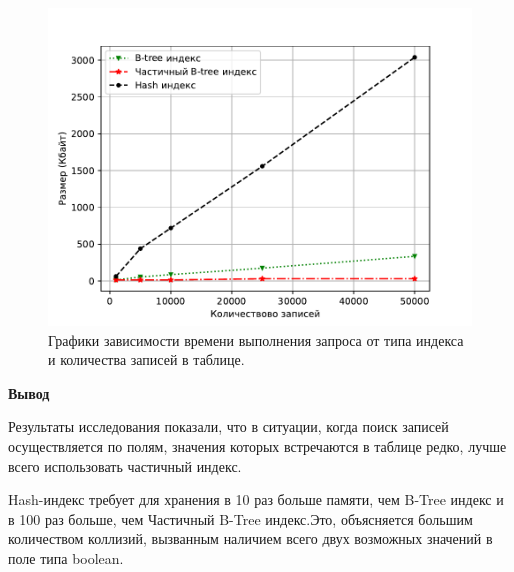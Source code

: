 \begin{figure}[h]
	\centering
	\includegraphics[width=1\textwidth, height=0.4\textheight]{research/mem}
	\caption{Графики зависимости времени выполнения запроса от типа индекса и количества записей в таблице.}
	\label{fig:memIdx}
\end{figure}

\textbf{Вывод}

Результаты исследования показали, что в ситуации, когда поиск записей осуществляется по полям, значения которых встречаются в таблице редко, лучше всего использовать частичный индекс.

Hash-индекс требует для хранения в 10 раз больше памяти, чем B-Tree индекс и в 100 раз больше, чем Частичный B-Tree индекс.Это, объясняется большим количеством коллизий, вызванным наличием всего двух возможных значений в поле типа boolean.
